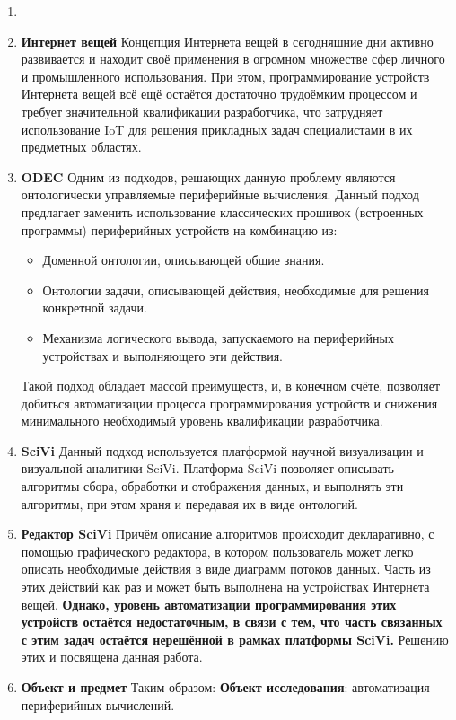\begin{enumerate}
	\item \textbf{}
	\item \textbf{Интернет вещей}
	Концепция Интернета вещей в сегодняшние дни активно развивается и находит своё применения в огромном множестве сфер личного и промышленного использования.
	При этом, программирование устройств Интернета вещей всё ещё остаётся достаточно трудоёмким процессом и требует значительной квалификации разработчика, что затрудняет использование IoT для решения прикладных задач специалистами в их предметных областях.
	\item \textbf{ODEC}
	Одним из подходов, решающих данную проблему являются онтологически управляемые периферийные вычисления.
	Данный подход предлагает заменить использование классических прошивок (встроенных программы) периферийных устройств на комбинацию из:
	\begin{itemize}
		\item Доменной онтологии, описывающей общие знания.
		\item Онтологии задачи, описывающей действия, необходимые для решения конкретной задачи.
		\item Механизма логического вывода, запускаемого на периферийных устройствах и выполняющего эти действия.
	\end{itemize}
	Такой подход обладает массой преимуществ, и, в конечном счёте, позволяет добиться автоматизации процесса программирования устройств и снижения минимального необходимый уровень квалификации разработчика.
	\item \textbf{SciVi}
	Данный подход используется платформой научной визуализации и визуальной аналитики SciVi.
	Платформа SciVi позволяет описывать алгоритмы сбора, обработки и отображения данных, и выполнять эти алгоритмы, при этом храня и передавая их в виде онтологий.
	\item \textbf{Редактор SciVi}
	Причём описание алгоритмов происходит декларативно, с помощью графического редактора, в котором пользователь может легко описать необходимые действия в виде диаграмм потоков данных.
	Часть из этих действий как раз и может быть выполнена на устройствах Интернета вещей.
	\textbf{Однако, уровень автоматизации программирования этих устройств остаётся недостаточным, в связи с тем, что часть связанных с этим задач остаётся нерешённой в рамках платформы SciVi.}
	Решению этих и посвящена данная работа.
	\item \textbf{Объект и предмет}
	Таким образом:
	\textbf{Объект исследования}: автоматизация периферийных вычислений.

\end{enumerate}
